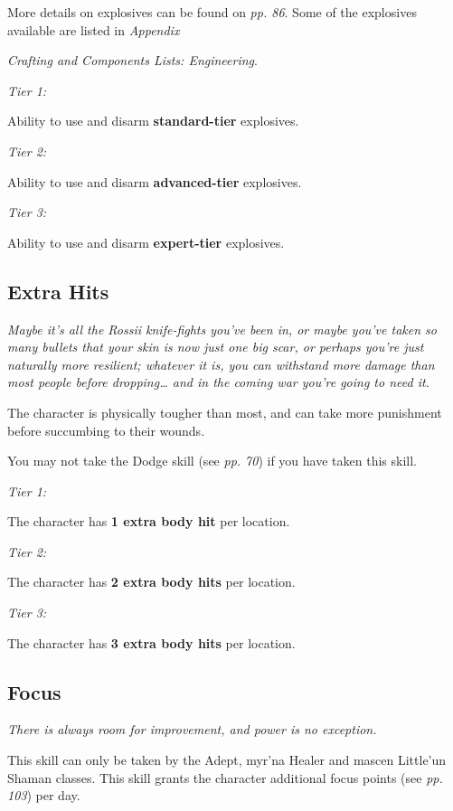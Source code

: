 More details on explosives can be found on \textit{pp. 86}. Some of the explosives available are listed in \textit{Appendix}

\textit{Crafting and Components Lists: Engineering}.

\textit{Tier 1:}

Ability to use and disarm \textbf{standard-tier} explosives.

\textit{Tier 2:}

Ability to use and disarm \textbf{advanced-tier} explosives.

\textit{Tier 3:}

Ability to use and disarm \textbf{expert-tier} explosives.

\subsection{Extra Hits}

\textit{Maybe it's all the Rossii knife-fights you've been in, or maybe you've taken so many bullets that your skin is now just one big scar, or perhaps you're just naturally more resilient; whatever it is, you can withstand more damage than most people before dropping{\dots} and in the coming war you're going to need it.}

The character is physically tougher than most, and can take more punishment before succumbing to their wounds.

You may not take the Dodge skill (see \textit{pp. 70}) if you have taken this skill.

\textit{Tier 1:}

The character has \textbf{1 extra body hit} per location.

\textit{Tier 2:}

The character has \textbf{2 extra body hits} per location.

\textit{Tier 3:}

The character has \textbf{3 extra body hits} per location.

\subsection{Focus}

\textit{There is always room for improvement, and power is no exception.}

This skill can only be taken by the Adept, myr'na Healer and mascen Little'un Shaman classes. This skill grants the character additional focus points (see \textit{pp. 103}) per day.

